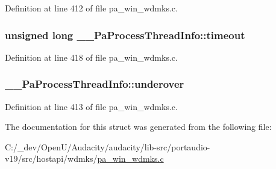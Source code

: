 Definition at line 412 of file pa\+\_\+win\+\_\+wdmks.\+c.

\subsubsection[{\texorpdfstring{timeout}{timeout}}]{\setlength{\rightskip}{0pt plus 5cm}unsigned long \+\_\+\+\_\+\+Pa\+Process\+Thread\+Info\+::timeout}\hypertarget{struct_____pa_process_thread_info_ae4e34696e69af44278c7633b96f4d683}{}\label{struct_____pa_process_thread_info_ae4e34696e69af44278c7633b96f4d683}


Definition at line 418 of file pa\+\_\+win\+\_\+wdmks.\+c.

\subsubsection[{\texorpdfstring{underover}{underover}}]{ \+\_\+\+\_\+\+Pa\+Process\+Thread\+Info\+::underover}\hypertarget{struct_____pa_process_thread_info_adaf9f419fc2faac367df5ce8807064a1}{}\label{struct_____pa_process_thread_info_adaf9f419fc2faac367df5ce8807064a1}


Definition at line 413 of file pa\+\_\+win\+\_\+wdmks.\+c.



The documentation for this struct was generated from the following file\+:\begin{DoxyCompactItemize}
\item 
C\+:/\+\_\+dev/\+Open\+U/\+Audacity/audacity/lib-\/src/portaudio-\/v19/src/hostapi/wdmks/\hyperlink{pa__win__wdmks_8c}{pa\+\_\+win\+\_\+wdmks.\+c}\end{DoxyCompactItemize}
